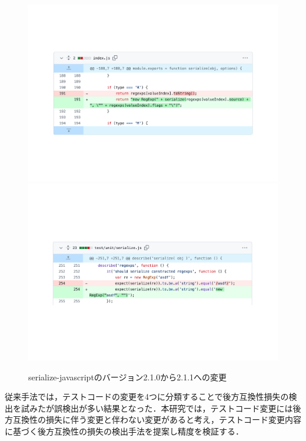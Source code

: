 \documentclass[11pt,dvipdfmx]{jreport}
\begin{document}
\begin{figure}[t]
  \centering
  \includegraphics[width=1.0\linewidth]{fig/rq1/serialize-javascript/index.pdf}
  \includegraphics[width=1.0\linewidth]{fig/rq1/serialize-javascript/index.test.pdf}
  \caption{serialize-javascriptのバージョン2.1.0から2.1.1への変更}
  \label{fig:motivation}
\end{figure}

従来手法では，テストコードの変更を4つに分類することで後方互換性損失の検出を試みたが誤検出が多い結果となった．本研究では，テストコード変更には後方互換性の損失に伴う変更と伴わない変更があると考え，テストコード変更内容に基づく後方互換性の損失の検出手法を提案し精度を検証する．
\end{document}

